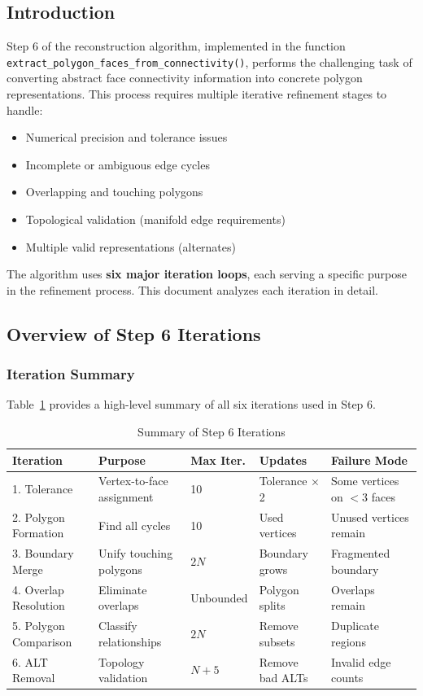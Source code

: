 
\subsection{Introduction}

Step 6 of the reconstruction algorithm, implemented in the function \texttt{extract\_polygon\_faces\_from\_connectivity()}, performs the challenging task of converting abstract face connectivity information into concrete polygon representations. This process requires multiple iterative refinement stages to handle:

\begin{itemize}
    \item Numerical precision and tolerance issues
    \item Incomplete or ambiguous edge cycles
    \item Overlapping and touching polygons
    \item Topological validation (manifold edge requirements)
    \item Multiple valid representations (alternates)
\end{itemize}

The algorithm uses \textbf{six major iteration loops}, each serving a specific purpose in the refinement process. This document analyzes each iteration in detail.

\subsection{Overview of Step 6 Iterations}

\subsubsection{Iteration Summary}

Table~\ref{tab:iterations} provides a high-level summary of all six iterations used in Step 6.

\begin{table}[h]
\centering
\caption{Summary of Step 6 Iterations}
\label{tab:iterations}
\small
\begin{tabular}{@{}lllll@{}}
\toprule
\textbf{Iteration} & \textbf{Purpose} & \textbf{Max Iter.} & \textbf{Updates} & \textbf{Failure Mode} \\
\midrule
1. Tolerance & Vertex-to-face assignment & 10 & Tolerance $\times$ 2 & Some vertices on $<3$ faces \\
2. Polygon Formation & Find all cycles & 10 & Used vertices & Unused vertices remain \\
3. Boundary Merge & Unify touching polygons & $2N$ & Boundary grows & Fragmented boundary \\
4. Overlap Resolution & Eliminate overlaps & Unbounded & Polygon splits & Overlaps remain \\
5. Polygon Comparison & Classify relationships & $2N$ & Remove subsets & Duplicate regions \\
6. ALT Removal & Topology validation & $N+5$ & Remove bad ALTs & Invalid edge counts \\
\bottomrule
\end{tabular}
\end{table}

